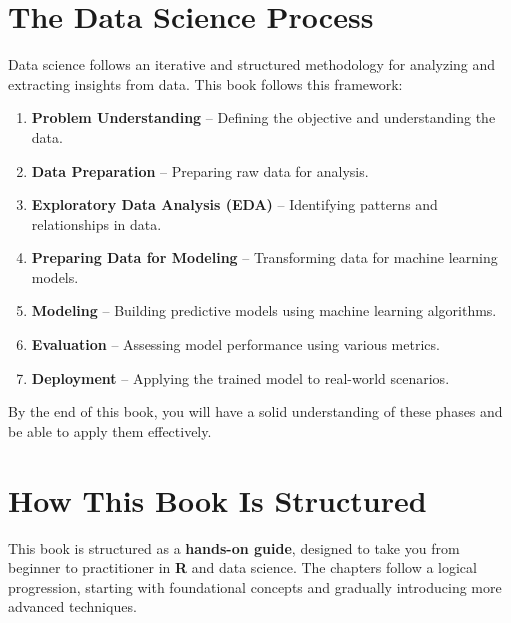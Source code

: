 \documentclass[
]{book}
\providecommand{\tightlist}{%
  \setlength{\itemsep}{0pt}\setlength{\parskip}{0pt}}
\theoremstyle{definition}
\theoremstyle{definition}
\theoremstyle{definition}
\theoremstyle{definition}
\theoremstyle{remark}
\begin{document}
\section*{The Data Science Process}\label{the-data-science-process}

Data science follows an iterative and structured methodology for analyzing and extracting insights from data. This book follows this framework:

\begin{enumerate}
\def\labelenumi{\arabic{enumi}.}
\tightlist
\item
  \textbf{Problem Understanding} -- Defining the objective and understanding the data.\\
\item
  \textbf{Data Preparation} -- Preparing raw data for analysis.\\
\item
  \textbf{Exploratory Data Analysis (EDA)} -- Identifying patterns and relationships in data.\\
\item
  \textbf{Preparing Data for Modeling} -- Transforming data for machine learning models.\\
\item
  \textbf{Modeling} -- Building predictive models using machine learning algorithms.\\
\item
  \textbf{Evaluation} -- Assessing model performance using various metrics.\\
\item
  \textbf{Deployment} -- Applying the trained model to real-world scenarios.
\end{enumerate}

By the end of this book, you will have a solid understanding of these phases and be able to apply them effectively.

\section*{How This Book Is Structured}\label{how-this-book-is-structured}

This book is structured as a \textbf{hands-on guide}, designed to take you from beginner to practitioner in \textbf{R} and data science. The chapters follow a logical progression, starting with foundational concepts and gradually introducing more advanced techniques.
\end{document}
